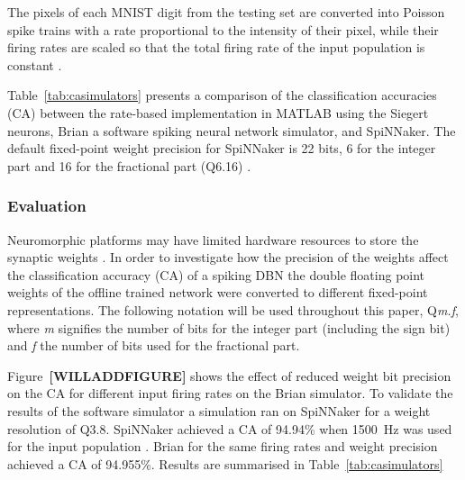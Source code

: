 The pixels of each MNIST digit from the testing set are converted into Poisson spike trains with a rate proportional to the intensity of their pixel, while their firing rates are scaled so that the total firing rate of the input population is constant \citep{10.3389/fnins.2013.00178}.

 
Table~\ref{tab:casimulators} presents a comparison of the classification accuracies (CA) between the rate-based implementation in MATLAB using the Siegert neurons, Brian \citep{} a software spiking neural network simulator, and SpiNNaker. The default fixed-point weight precision for SpiNNaker is 22 bits, 6 for the integer part and 16 for the fractional part (Q6.16) \citep{}.





\subsubsection{Evaluation}


Neuromorphic platforms may have limited hardware resources to store the synaptic weights \citep{Schemmel_etal10,Merolla08082014}. In order to investigate how the precision of the weights affect the classification accuracy (CA) of a spiking DBN the double floating point weights of the offline trained network were converted to different fixed-point representations. The following notation will be used throughout this paper, Q\textit{m.f}, where \textit{m} signifies the number of bits for the integer part (including the sign bit) and \textit{f} the number of bits used for the fractional part.

Figure~\textbf{[WILLADDFIGURE]} shows the effect of reduced weight bit precision on the CA for different input firing rates on the Brian simulator. To validate the results of the software simulator a simulation ran on SpiNNaker for a weight resolution of Q3.8. SpiNNaker achieved a CA of 94.94\% when 1500~Hz was used for the input population \citep{SpinnakerDBN2015,iscasSpinnakerAcceptedDemo}. Brian for the same firing rates and weight precision achieved a CA of 94.955\%. Results are summarised in Table~\ref{tab:casimulators}   


